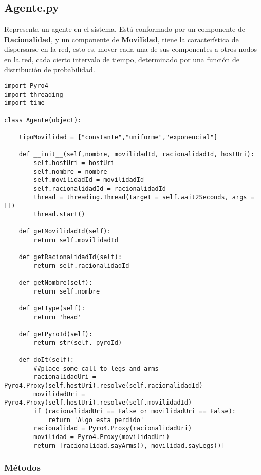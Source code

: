 \documentclass{article}
\begin{document}
\subsection{Agente.py}
Representa un agente en el sistema. Está conformado por un componente de \textbf{Racionalidad}, y un componente de \textbf{Movilidad}, tiene la característica de dispersarse en la red, esto es, mover cada una de sus componentes a otros nodos en la red, cada cierto intervalo de tiempo, determinado por una función de distribución de probabilidad.\\

\begin{lstlisting}
import Pyro4
import threading
import time

class Agente(object):
    
    tipoMovilidad = ["constante","uniforme","exponencial"]    
    
    def __init__(self,nombre, movilidadId, racionalidadId, hostUri):
        self.hostUri = hostUri
        self.nombre = nombre
        self.movilidadId = movilidadId
        self.racionalidadId = racionalidadId
        thread = threading.Thread(target = self.wait2Seconds, args = [])
        thread.start()

    def getMovilidadId(self):
        return self.movilidadId

    def getRacionalidadId(self):
        return self.racionalidadId
        
    def getNombre(self):
        return self.nombre
        
    def getType(self):
        return 'head'

    def getPyroId(self):
        return str(self._pyroId)

    def doIt(self):
        ##place some call to legs and arms
        racionalidadUri = Pyro4.Proxy(self.hostUri).resolve(self.racionalidadId)
        movilidadUri =  Pyro4.Proxy(self.hostUri).resolve(self.movilidadId)
        if (racionalidadUri == False or movilidadUri == False):
            return 'Algo esta perdido'
        racionalidad = Pyro4.Proxy(racionalidadUri)
        movilidad = Pyro4.Proxy(movilidadUri)
        return [racionalidad.sayArms(), movilidad.sayLegs()]
\end{lstlisting}

\subsubsection*{\textbf{Métodos}}
\end{document}
